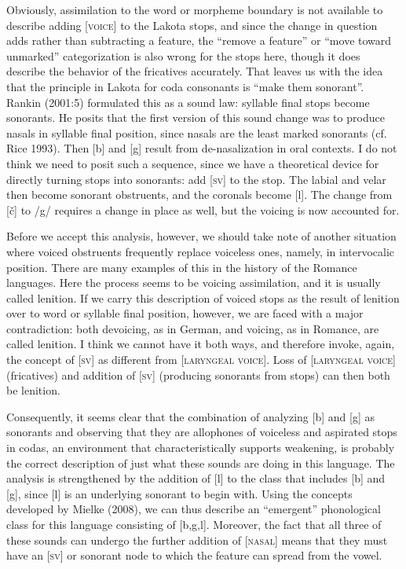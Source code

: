 \documentclass[output=paper]{LSP/langsci}
\begin{document}
Obviously, assimilation to the word or morpheme boundary is not available to describe adding [\textsc{voice}] to the Lakota stops, and since the change in question adds rather than subtracting a feature, the ``remove a feature'' or ``move toward unmarked'' categorization is also wrong for the stops here, though it does describe the behavior of the fricatives accurately. That leaves us with the idea that the principle in Lakota for coda consonants is ``make them sonorant''. Rankin (2001:5) formulated this as a sound law: syllable final stops become sonorants. He posits that the first version of this sound change was to produce nasals in syllable final position, since nasals are the least marked sonorants (cf. Rice 1993). Then [b] and [g] result from de-nasalization in oral contexts. I do not think we need to posit such a sequence, since we have a theoretical device for directly turning stops into sonorants: add [\textsc{sv}] to the stop. The labial and velar then become sonorant obstruents, and the coronals become [l]. The change from [\v{c}] to /g/ requires a change in place as well, but the voicing is now accounted for.

Before we accept this analysis, however, we should take note of another situation where voiced obstruents frequently replace voiceless ones, namely, in intervocalic position. There are many examples of this in the history of the Romance languages. Here the process seems to be voicing assimilation, and it is usually called lenition. If we carry this description of voiced stops as the result of lenition over to word or syllable final position, however, we are faced with a major contradiction: both devoicing, as in German, and voicing, as in Romance, are called lenition. I think we cannot have it both ways, and therefore invoke, again, the concept of [\textsc{sv}] as different from [\textsc{laryngeal voice}]. Loss of [\textsc{laryngeal voice}] (fricatives) and addition of [\textsc{sv}] (producing sonorants from stops) can then both be lenition.

Consequently, it seems clear that the combination of analyzing [b] and [g] as sonorants and observing that they are allophones of voiceless and aspirated stops in codas, an environment that characteristically supports weakening, is probably the correct description of just what these sounds are doing in this language. The analysis is strengthened by the addition of [l] to the class that includes [b] and [g], since [l] is an underlying sonorant to begin with. Using the concepts developed by Mielke (2008), we can thus describe an ``emergent'' phonological class for this language consisting of [b,g,l]. Moreover, the fact that all three of these sounds can undergo the further addition of [\textsc{nasal}] means that they must have an [\textsc{sv}] or sonorant node to which the feature can spread from the vowel.
\end{document}
